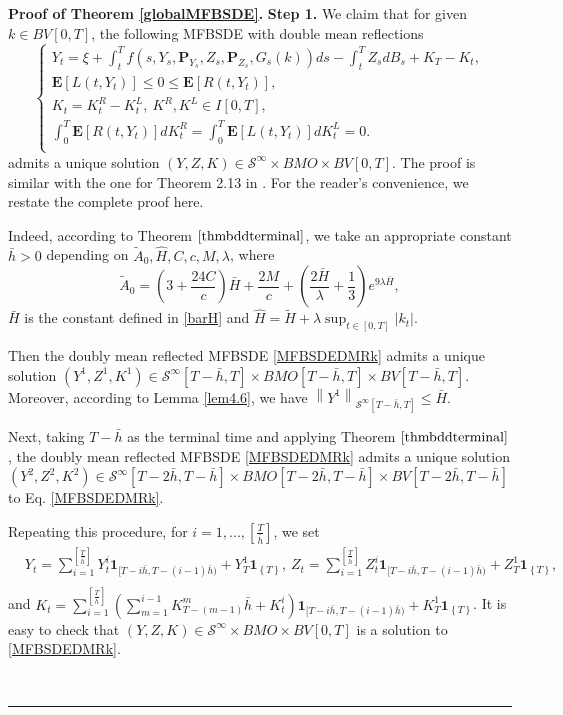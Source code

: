 \documentclass[10pt]{article}%
\numberwithin{equation}{section}
\newenvironment{proof}[1][Proof]{\noindent \textbf{#1.} }{\  \rule{0.5em}{0.5em}}
\begin{document}
\begin{proof}[Proof of Theorem \ref{globalMFBSDE}] 
  {\bf Step 1. } We claim that for given $k\in BV[0,T]$, the following MFBSDE with double mean reflections
 \begin{equation}\label{MFBSDEDMRk}
\begin{cases}
Y_t=\xi+\int_t^T f(s,Y_s,\mathbf{P}_{Y_s},Z_s,\mathbf{P}_{Z_s},G_s(k))ds-\int_t^T Z_s dB_s+K_T-K_t, \\
\mathbf{E}[L(t,Y_t)]\leq 0\leq \mathbf{E}[R(t,Y_t)], \\
K_t=K^R_t-K^L_t,\ K^R,K^L\in I[0,T],\\
\int_0^T \mathbf{E}[R(t,Y_t)]dK_t^R=\int_0^T \mathbf{E}[L(t,Y_t)]dK^L_t=0.\\
\end{cases}
\end{equation}
admits a unique solution $(Y,Z,K)\in\mathcal{S}^{\infty}\times BMO \times BV[0,T]$. The proof is similar with the one for Theorem 2.13 in \cite{LP}. For the reader's convenience, we restate the complete proof here.

Indeed, according to Theorem $\ref{thmbddterminal}$, we take an appropriate constant $\bar{h}>0$ depending on $\tilde{A}_0,\hat{H},C,c,M,\lambda$, where $$\tilde{A}_0=(3+\frac{24C}{c})\bar{H}+\frac{2M}{c}+(\frac{2\bar{H}}{\lambda}+\frac{1}{3})e^{9\lambda \bar{H}},$$
$\bar{H}$ is the constant defined in \eqref{barH} and $\hat{H}=\tilde{H}+\lambda\sup_{t\in[0,T]}\left|k_t\right|$. 

Then the doubly mean reflected MFBSDE \eqref{MFBSDEDMRk} admits a unique solution $(Y^1,Z^1,K^1)\in\mathcal{S}^{\infty}[T-\bar{h},T]\times BMO[T-\bar{h},T]\times BV[T-\bar{h},T]$. Moreover, according to Lemma \ref{lem4.6}, we have $\left\|Y^1\right\|_{\mathcal{S}^{\infty}[T-\bar{h},T]}\leq \bar{H}.$ 

Next,  taking $T-\bar{h}$ as the terminal time and applying Theorem $\ref{thmbddterminal}$, the doubly mean reflected MFBSDE \eqref{MFBSDEDMRk} admits a unique solution $(Y^2,Z^2,K^2)\in\mathcal{S}^{\infty}[T-2\bar{h},T-\bar{h}]\times BMO[T-2\bar{h},T-\bar{h}]\times BV[T-2\bar{h},T-\bar{h}]$ to Eq. \eqref{MFBSDEDMRk}. 

Repeating this procedure, for $i=1,...,[\frac{T}{\bar{h}}]$, we set 
\begin{equation}\begin{split}
 &Y_t=\sum_{i=1}^{[\frac{T}{\bar{h}}]} Y_t^i \mathbf{1}_{[T-i\bar{h},T-(i-1)\bar{h})}+Y_T^1 \mathbf{1}_{\left\{T\right\}}, \ Z_t=\sum_{i=1}^{[\frac{T}{\bar{h}}]} Z_t^i \mathbf{1}_{[T-i\bar{h},T-(i-1)\bar{h})}+Z_T^1 \mathbf{1}_{\left\{T\right\}},\\
\end{split}  
\end{equation}
and $K_t=\sum_{i=1}^{[\frac{T}{\bar{h}}]}(\sum_{m=1}^{i-1}K^{m}_{T-(m-1)}\bar{h}+K_t^i)\mathbf{1}_{[T-i\bar{h},T-(i-1)\bar{h})}+K_T^1 \mathbf{1}_{\left\{T\right\}}$. It is easy to check that  $(Y,Z,K)\in\mathcal{S}^{\infty}\times BMO \times BV[0,T]$ is a solution to \eqref{MFBSDEDMRk}. 


\end{proof}
\end{document}
